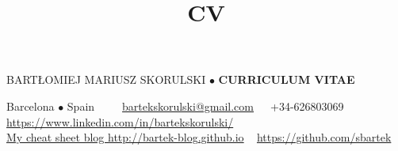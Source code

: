 \documentclass[a4paper, oneside]{scrreprt}
\title{CV}
\author{}
\date{}
\begin{document}
\noindent BARTŁOMIEJ MARIUSZ SKORULSKI $\bullet$ \textbf{CURRICULUM VITAE}

\vspace{-0.3cm}
\noindent\makebox[\linewidth]{\rule{\textwidth}{0.4pt}}


\noindent\llap{\FA \faHome\ \ } Barcelona $\bullet$ Spain\ \
{\FA \faEnvelope\ \ }\ \href{mailto:bartekskorulski@gmail.com}{bartekskorulski@gmail.com}\ \ 
{\FA \faMobilePhone}\  +34-626803069\\
\noindent\llap{\FA \faLinkedin\ \ }
\href{https://www.linkedin.com/in/bartekskorulski/}{https://www.linkedin.com/in/bartekskorulski/}\\
\noindent\llap{\FA \faStickyNote\ \ } 
\href{http://bartek-blog.github.io/}{My cheat sheet blog http://bartek-blog.github.io}
{\FA \faGithub\ } \href{https://github.com/sbartek}{https://github.com/sbartek}\ \ 


\end{document}
